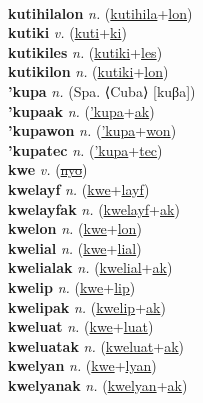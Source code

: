  \label{kutihila} \\
\textbf{kutihilalon} \textit{n.} (\hyperref[kutihila]{kutihila}+\hyperref[lon]{lon})
 \label{kutihilalon} \\
\textbf{kutiki} \textit{v.} (\hyperref[kuti]{kuti}+\hyperref[ki]{ki})
 \label{kutiki} \\
\textbf{kutikiles} \textit{n.} (\hyperref[kutiki]{kutiki}+\hyperref[les]{les})
 \label{kutikiles} \\
\textbf{kutikilon} \textit{n.} (\hyperref[kutiki]{kutiki}+\hyperref[lon]{lon})
 \label{kutikilon} \\
\textbf{'kupa} \textit{n.} (Spa. ⟨Cuba⟩ [kuβa])
 \label{'kupa} \\
\textbf{'kupaak} \textit{n.} (\hyperref['kupa]{'kupa}+\hyperref[ak]{ak})
 \label{'kupaak} \\
\textbf{'kupawon} \textit{n.} (\hyperref['kupa]{'kupa}+\hyperref[won]{won})
 \label{'kupawon} \\
\textbf{'kupatec} \textit{n.} (\hyperref['kupa]{'kupa}+\hyperref[tec]{tec})
 \label{'kupatec} \\
\textbf{kwe} \textit{v.} (\hyperref[nyo]{\sout{nyo}})
 \label{kwe} \\
\textbf{kwelayf} \textit{n.} (\hyperref[kwe]{kwe}+\hyperref[layf]{layf})
 \label{kwelayf} \\
\textbf{kwelayfak} \textit{n.} (\hyperref[kwelayf]{kwelayf}+\hyperref[ak]{ak})
 \label{kwelayfak} \\
\textbf{kwelon} \textit{n.} (\hyperref[kwe]{kwe}+\hyperref[lon]{lon})
 \label{kwelon} \\
\textbf{kwelial} \textit{n.} (\hyperref[kwe]{kwe}+\hyperref[lial]{lial})
 \label{kwelial} \\
\textbf{kwelialak} \textit{n.} (\hyperref[kwelial]{kwelial}+\hyperref[ak]{ak})
 \label{kwelialak} \\
\textbf{kwelip} \textit{n.} (\hyperref[kwe]{kwe}+\hyperref[lip]{lip})
 \label{kwelip} \\
\textbf{kwelipak} \textit{n.} (\hyperref[kwelip]{kwelip}+\hyperref[ak]{ak})
 \label{kwelipak} \\
\textbf{kweluat} \textit{n.} (\hyperref[kwe]{kwe}+\hyperref[luat]{luat})
 \label{kweluat} \\
\textbf{kweluatak} \textit{n.} (\hyperref[kweluat]{kweluat}+\hyperref[ak]{ak})
 \label{kweluatak} \\
\textbf{kwelyan} \textit{n.} (\hyperref[kwe]{kwe}+\hyperref[lyan]{lyan})
 \label{kwelyan} \\
\textbf{kwelyanak} \textit{n.} (\hyperref[kwelyan]{kwelyan}+\hyperref[ak]{ak})

